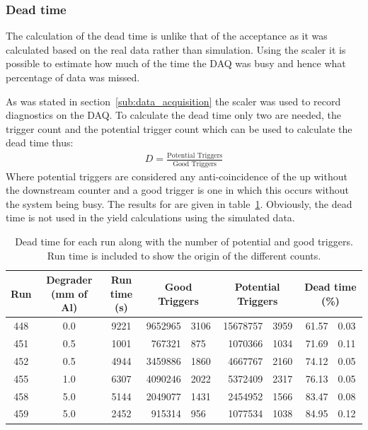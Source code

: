 \subsubsection{Dead time} %
\label{sub:dead_time}
The calculation of the dead time is unlike that of the acceptance as it was calculated based on the real data rather than simulation. Using the scaler it is possible to estimate how much of the time the DAQ was busy and hence what percentage of data was missed. 

As was stated in section~\ref{sub:data_acquisition} the scaler was used to record diagnostics on the DAQ. To calculate the dead time only two are needed, the trigger count and the potential trigger count which can be used to calculate the dead time thus:
\begin{align}
    D = \frac{\text{Potential Triggers}}{\text{Good Triggers}}
\end{align}
Where potential triggers are considered any anti-coincidence of the up without the downstream counter and a good trigger is one in which this occurs without the system being busy. The results for are given in table~\ref{tab:dead_time}. Obviously, the dead time is not used in the yield calculations using the simulated data.
\begin{table}
    \begin{center}
    \begin{tabular}{c|c|c|r@{ $\pm$ }l|r@{ $\pm$ }l|r@{ $\pm$ }l }
        Run & Degrader (mm of Al) & Run time (s) &
                              \multicolumn{2}{|c}{Good Triggers} &      
                              \multicolumn{2}{|c}{Potential Triggers} &
                              \multicolumn{2}{|c}{Dead time (\%)} \\
        \hline
        448 & 0.0 & 9221 & 9652965 & 3106 & 15678757 & 3959 & 61.57 & 0.03 \\
        451 & 0.5 & 1001 &  767321 & 875  &  1070366 & 1034 & 71.69 & 0.11 \\
        452 & 0.5 & 4944 & 3459886 & 1860 &  4667767 & 2160 & 74.12 & 0.05 \\
        455 & 1.0 & 6307 & 4090246 & 2022 &  5372409 & 2317 & 76.13 & 0.05 \\
        458 & 5.0 & 5144 & 2049077 & 1431 &  2454952 & 1566 & 83.47 & 0.08 \\
        459 & 5.0 & 2452 &  915314 & 956  &  1077534 & 1038 & 84.95 & 0.12 \\
    \end{tabular}
    \end{center}
    \caption{Dead time for each run along with the number of potential and good triggers. Run time is included to show the origin of the different counts.}
    \label{tab:dead_time}
\end{table}
